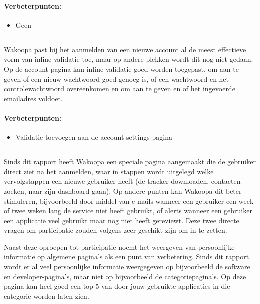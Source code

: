 \documentclass[a4paper, 10pt, pdftex]{report}
\begin{document}
      \paragraph{\textbf{Verbeterpunten:}}
      \begin{itemize}
        \item Geen
      \end{itemize}

    \subsection{\cite{Wroblewski2009}}
    Wakoopa past bij het aanmelden van een nieuwe account al de meest effectieve vorm van inline validatie toe, maar op andere plekken wordt dit nog niet gedaan. Op de account pagina kan inline validatie goed worden toegepast, om aan te geven of een nieuw wachtwoord goed genoeg is, of een wachtwoord en het controlewachtwoord overeenkomen en om aan te geven en of het ingevoerde emailadres voldoet.

      \paragraph{\textbf{Verbeterpunten:}}
      \begin{itemize}
        \item Validatie toevoegen aan de account settings pagina
      \end{itemize}

    \subsection{\cite{Alfrink2008}}
    Sinds dit rapport heeft Wakoopa een speciale pagina aangemaakt die de gebruiker direct ziet na het aanmelden, waar in stappen wordt uitgelegd welke vervolgstappen een nieuwe gebruiker heeft (de tracker downloaden, contacten zoeken, naar zijn dashboard gaan). Op andere punten kan Wakoopa dit beter stimuleren, bijvoorbeeld door middel van e-mails wanneer een gebruiker een week of twee weken lang de service niet heeft gebruikt, of alerts wanneer een gebruiker een applicatie veel gebruikt maar nog niet heeft gereviewt. Deze twee directe vragen om participatie zouden volgens \citeauthor{Alfrink2008} zeer geschikt zijn om in te zetten.

    Naast deze oproepen tot participatie noemt \citeauthor{Alfrink2008} het weergeven van persoonlijke informatie op algemene pagina's als een punt van verbetering. Sinds dit rapport wordt er al veel persoonlijke informatie weergegeven op bijvoorbeeld de software en developer-pagina's, maar niet op bijvoorbeeld de categoriepagina's. Op deze pagina kan heel goed een top-5 van door jouw gebruikte applicaties in die categorie worden laten zien.
\end{document}
